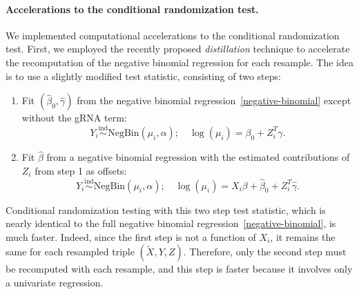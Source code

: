 \documentclass{nature}
\begin{document}
\paragraph{Accelerations to the conditional randomization test.}
We implemented computational accelerations to the conditional randomization test. First, we employed the recently proposed\cite{Liu2020} \textit{distillation} technique to accelerate the recomputation of the negative binomial regression for each resample. The idea is to use a slightly modified test statistic, consisting of two steps:
\begin{enumerate}
	\item Fit $(\widehat \beta_0, \widehat \gamma)$ from the negative binomial regression~\eqref{negative-binomial} except without the gRNA term:
	\begin{equation}
	Y_i \overset{\text{ind}}\sim \textrm{NegBin}(\mu_i, \alpha); \quad \log(\mu_i) = \beta_0 + Z_i^T \gamma.
	\label{negative-binomial-distillation}
	\end{equation}
	\item Fit $\widehat \beta$ from a negative binomial regression with the estimated contributions of $Z_i$ from step 1 as offsets:
	\begin{equation}
	Y_i \overset{\text{ind}}\sim \textrm{NegBin}(\mu_i, \alpha); \quad \log(\mu_i) = X_i \beta + \widehat \beta_0 + Z_i^T \widehat \gamma.
	\label{distilled-negative-binomial}
	\end{equation}
\end{enumerate}
Conditional randomization testing with this two step test statistic, which is nearly identical to the full negative binomial regression~\eqref{negative-binomial}, is much faster. Indeed, since the first step is not a function of $X_i$, it remains the same for each resampled triple $(\widetilde X, Y, Z)$. Therefore, only the second step must be recomputed with each resample, and this step is faster because it involves only a univariate regression.
\end{document}
